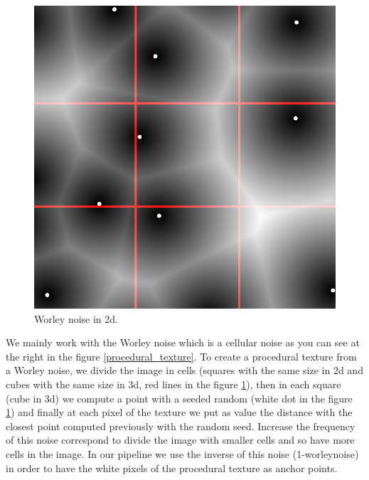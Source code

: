 \begin{figure}
    \begin{center}
    \includegraphics[scale=0.2]{images/noise/worley_explain.png}
    \end{center}
    \caption{Worley noise in 2d.}
    \label{worley_explain}
\end{figure}

We mainly work with the Worley noise which is a cellular noise as you can see at the right in the figure \ref{procedural_texture}. To create a procedural texture from a Worley noise, we divide the image in cells (squares with the same size in 2d and cubes with the same size in 3d, red lines in the figure \ref{worley_explain}), then in each square (cube in 3d) we compute a point with a seeded random (white dot in the figure \ref{worley_explain}) and finally at each pixel of the texture we put as value the distance with the closest point computed previously with the random seed. Increase the frequency of this noise correspond to divide the image with smaller cells and so have more cells in the image. In our pipeline we use the inverse of this noise (1-worleynoise) in order to have the white pixels of the procedural texture as anchor points.

